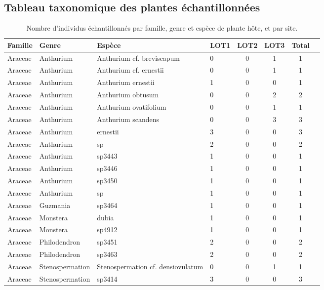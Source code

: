 \documentclass[a4paper,12pt]{article}
\begin{document}
\subsection{Tableau taxonomique des plantes échantillonnées}
\begin{table}[H]
    \centering
    \caption{Nombre d'individus échantillonnés par famille, genre et espèce de plante hôte, et par site.}
    \renewcommand{\arraystretch}{1.1}
    \setlength{\tabcolsep}{2pt}
    \scriptsize
    \begin{tabular}{llllcccc}
        \hline
        \textbf{Famille} & \textbf{Genre} & \textbf{Espèce} & \textbf{LOT1} & \textbf{LOT2} & \textbf{LOT3} & \textbf{Total} \\
        \hline
        Araceae & Anthurium & Anthurium cf. breviscapum & 0 & 0 & 1 & 1 \\
        Araceae & Anthurium & Anthurium cf. ernestii & 0 & 0 & 1 & 1 \\
        Araceae & Anthurium & Anthurium ernestii & 1 & 0 & 0 & 1 \\
        Araceae & Anthurium & Anthurium obtusum & 0 & 0 & 2 & 2 \\
        Araceae & Anthurium & Anthurium ovatifolium & 0 & 0 & 1 & 1 \\
        Araceae & Anthurium & Anthurium scandens & 0 & 0 & 3 & 3 \\
        Araceae & Anthurium & ernestii & 3 & 0 & 0 & 3 \\
        Araceae & Anthurium & sp & 2 & 0 & 0 & 2 \\
        Araceae & Anthurium & sp3443 & 1 & 0 & 0 & 1 \\
        Araceae & Anthurium & sp3446 & 1 & 0 & 0 & 1 \\
        Araceae & Anthurium & sp3450 & 1 & 0 & 0 & 1 \\
        Araceae & Anthurium  & sp & 1 & 0 & 0 & 1 \\
        Araceae & Guzmania & sp3464 & 1 & 0 & 0 & 1 \\
        Araceae & Monstera & dubia & 1 & 0 & 0 & 1 \\
        Araceae & Monstera & sp4912 & 1 & 0 & 0 & 1 \\
        Araceae & Philodendron & sp3451 & 2 & 0 & 0 & 2 \\
        Araceae & Philodendron & sp3463 & 2 & 0 & 0 & 2 \\
        Araceae & Stenospermation & Stenospermation cf. densiovulatum & 0 & 0 & 1 & 1 \\
        Araceae & Stenospermation & sp3414 & 3 & 0 & 0 & 3 \\

\end{tabular}
\end{table}
\end{document}
